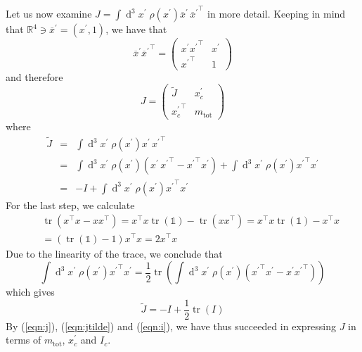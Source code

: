 \documentclass[a4paper]{article}
\begin{document}
Let us now examine $J = \int \operatorname{d}^3\!x^\prime\; \rho(x^\prime) \overline{x}^\prime\,{\overline{x}^\prime}^\top$ in more detail. Keeping in mind that $\mathbb{R}^4 \ni \overline{x}^\prime = (x^\prime, 1)$, we have that
\begin{equation}
\overline{x}^\prime {\overline{x}^\prime}^\top =
\left(\begin{array}{cc}
x^\prime {x^\prime}^\top & x^\prime\\
{x^\prime}^\top & 1
\end{array}\right)
\end{equation}
and therefore
\begin{equation}
\label{eqn:j}
J = \left(\begin{array}{cc}
\tilde{J} & x_c^\prime\\
{x_c^\prime}^\top & m_\mathrm{tot}
\end{array}\right)
\end{equation}
where
\begin{eqnarray}
\nonumber \tilde{J} &=& \int \operatorname{d}^3\!x^\prime\; \rho(x^\prime) x^\prime\,{x^\prime}^\top\\
\nonumber &=& \int \operatorname{d}^3\!x^\prime\; \rho(x^\prime) \left(x^\prime\,{x^\prime}^\top - {x^\prime}^\top x^\prime \right) + \int \operatorname{d}^3\!x^\prime\; \rho(x^\prime) {x^\prime}^\top{x^\prime}\\
&=& -I + \int \operatorname{d}^3\!x^\prime\; \rho(x^\prime) {x^\prime}^\top{x^\prime}
\end{eqnarray}
For the last step, we calculate
\begin{eqnarray}
\nonumber&&\operatorname{tr}(x^\top x - x x^\top)
= x^\top x \operatorname{tr}(\mathbb{1}) - \operatorname{tr}(xx^\top)
= x^\top x \operatorname{tr}(\mathbb{1}) - x^\top x\\
&&= (\operatorname{tr}(\mathbb{1}) - 1) x^\top x
= 2 x^\top x
\end{eqnarray}
Due to the linearity of the trace, we conclude that
\begin{equation}
\int\operatorname{d}^3\!x^\prime\; \rho(x^\prime) {x^\prime}^\top x^\prime
= \frac{1}{2} \operatorname{tr} \left( \int\operatorname{d}^3\!x^\prime\; \rho(x^\prime) \left( {x^\prime}^\top x^\prime - x^\prime {x^\prime}^\top \right) \right)
\end{equation}
which gives
\begin{equation}
\label{eqn:jtilde}
\tilde{J} = -I + \frac{1}{2} \operatorname{tr}(I)
\end{equation}
By (\ref{eqn:j}), (\ref{eqn:jtilde}) and (\ref{eqn:i}), we have thus succeeded in expressing $J$ in terms of $m_\mathrm{tot}$, $x_c^\prime$ and $I_c$.
\end{document}
